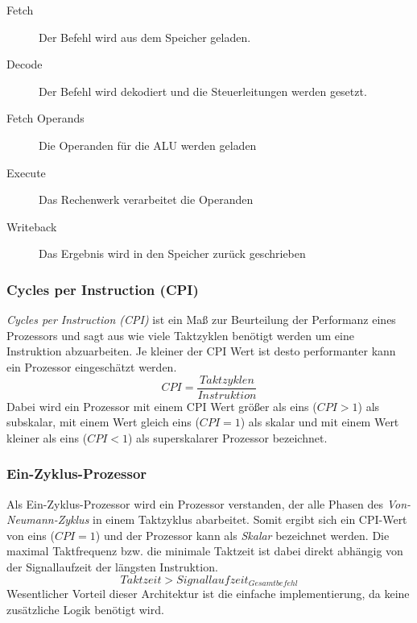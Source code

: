                 \begin{description}
                    \item[Fetch] Der Befehl wird aus dem Speicher geladen.
                    \item[Decode] Der Befehl wird dekodiert und die Steuerleitungen werden gesetzt.
                    \item[Fetch Operands] Die Operanden für die ALU werden geladen 
                    \item[Execute] Das Rechenwerk verarbeitet die Operanden
                    \item[Writeback] Das Ergebnis wird in den Speicher zurück geschrieben
                \end{description}


            \subsubsection{Cycles per Instruction (CPI)}
                \textit{Cycles per Instruction (CPI)} ist ein Maß zur Beurteilung der Performanz eines Prozessors
                und sagt aus wie viele Taktzyklen benötigt werden um eine Instruktion abzuarbeiten.
                Je kleiner der CPI Wert ist desto performanter kann ein Prozessor eingeschätzt werden.
                \begin{equation}
                    CPI = \frac{Taktzyklen}{Instruktion}
                \end{equation}
                Dabei wird ein Prozessor mit einem CPI Wert größer als eins ($CPI > 1$) als subskalar,
                mit einem Wert gleich eins ($CPI = 1$) als skalar und mit einem Wert kleiner als eins
                ($CPI < 1$) als superskalarer Prozessor bezeichnet.
   

            \subsubsection{Ein-Zyklus-Prozessor}
                Als Ein-Zyklus-Prozessor wird ein Prozessor verstanden, der alle Phasen des \textit{Von-Neumann-Zyklus}
                in einem Taktzyklus abarbeitet.
                Somit ergibt sich ein CPI-Wert von eins ($CPI = 1$) und der Prozessor kann als \textit{Skalar} bezeichnet werden.
                Die maximal Taktfrequenz bzw. die minimale Taktzeit ist dabei direkt abhängig von der Signallaufzeit
                der längsten Instruktion.
                \begin{equation}
                    Taktzeit > Signallaufzeit_{Gesamtbefehl}
                \end{equation}
                Wesentlicher Vorteil dieser Architektur ist die einfache implementierung, da
                keine zusätzliche Logik benötigt wird.

